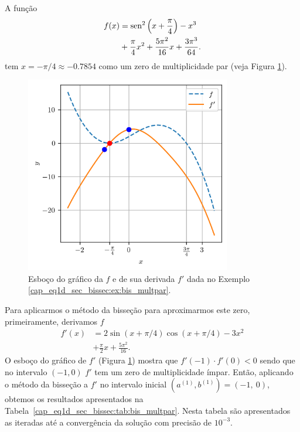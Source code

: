 \begin{ex}\label{cap_eq1d_sec_bissec:ex:bis_multpar}
  A função
  \begin{equation}
    \begin{aligned}
      f(x) &= \operatorname{sen}^2\left(x+\frac{\pi}{4}\right) - x^3 \\
           &+ \frac{\pi}{4}x^2 + \frac{5\pi^2}{16}x + \frac{3\pi^3}{64}.
    \end{aligned}
\end{equation}
tem $x=-\pi/4\approx -0.7854$ como um zero de multiplicidade par (veja Figura \ref{cap_eq1d_sec_bissec:fig:bis_multpar}).

\begin{figure}[H]
  \centering
  \includegraphics[width=0.8\textwidth]{./cap_eq1d/dados/fig_bis_multpar/fig}
  \caption{Esboço do gráfico da $f$ e de sua derivada $f'$ dada no Exemplo \ref{cap_eq1d_sec_bissec:ex:bis_multpar}.}
  \label{cap_eq1d_sec_bissec:fig:bis_multpar}
\end{figure}

Para aplicarmos o método da bisseção para aproximarmos este zero, primeiramente, derivamos $f$
\begin{equation}
  \begin{aligned}
    f'(x) &= 2\sin(x+\pi/4)\cos(x+\pi/4) - 3x^2 \\
          &+ \frac{\pi}{2}x + \frac{5\pi^2}{16}.
  \end{aligned}
\end{equation}
O esboço do gráfico de $f'$ (Figura \ref{cap_eq1d_sec_bissec:fig:bis_multpar}) mostra que $f'(-1)\cdot f'(0) < 0$ sendo que no intervalo $(-1, 0)$ $f'$ tem um zero de multiplicidade ímpar. Então, aplicando o método da bisseção a $f'$ no intervalo inicial $(a^{(1)}, b^{(1)}) = (-1, ~0)$, obtemos os resultados apresentados na Tabela~\ref{cap_eq1d_sec_bissec:tab:bis_multpar}. Nesta tabela são apresentados as iteradas até a convergência da solução com precisão de $10^{-3}$.


\end{ex}
